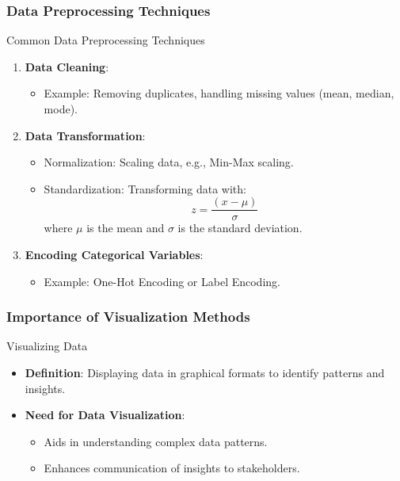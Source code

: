 \documentclass[aspectratio=169]{beamer}
\begin{document}
\begin{frame}[fragile]
    \frametitle{Data Preprocessing Techniques}
    \begin{block}{Common Data Preprocessing Techniques}
        \begin{enumerate}
            \item \textbf{Data Cleaning}:
                \begin{itemize}
                    \item Example: Removing duplicates, handling missing values (mean, median, mode).
                \end{itemize}
            \item \textbf{Data Transformation}:
                \begin{itemize}
                    \item Normalization: Scaling data, e.g., Min-Max scaling.
                    \item Standardization: Transforming data with:
                    \begin{equation}
                    z = \frac{(x - \mu)}{\sigma}
                    \end{equation}
                    where $\mu$ is the mean and $\sigma$ is the standard deviation.
                \end{itemize}
            \item \textbf{Encoding Categorical Variables}:
                \begin{itemize}
                    \item Example: One-Hot Encoding or Label Encoding.
                \end{itemize}
        \end{enumerate}
    \end{block}
\end{frame}

\begin{frame}[fragile]
    \frametitle{Importance of Visualization Methods}
    \begin{block}{Visualizing Data}
        \begin{itemize}
            \item \textbf{Definition}: Displaying data in graphical formats to identify patterns and insights.
            \item \textbf{Need for Data Visualization}:
            \begin{itemize}
                \item Aids in understanding complex data patterns.
                \item Enhances communication of insights to stakeholders.
            \end{itemize}
        \end{itemize}
    \end{block}
\end{frame}
\end{document}
